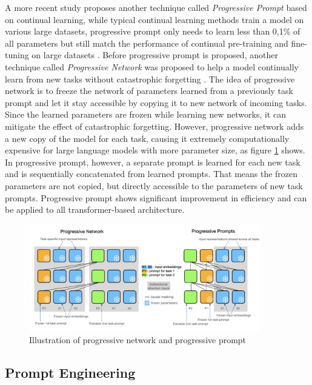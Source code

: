 \documentclass[runningheads]{llncs}
\begin{document}
\noindent \newline
A more recent study proposes another technique called \textit{Progressive Prompt} based on continual learning, while typical continual learning methods train a model on various large datasets, progressive prompt only needs
to learn less than 0,1\% of all parameters but still match the performance of continual pre-training and fine-tuning on large datasets \cite{Razda23}. Before progressive prompt is proposed, another technique called \textit{Progressive Network}
was proposed to help a model continually learn from new tasks without catastrophic forgetting \cite{Rusu16}. The idea of progressive network is to freeze the network of parameters learned from a previously task prompt and let it stay accessible by copying it to new
network of incoming tasks. Since the learned parameters are frozen while learning new networks, it can mitigate the effect of catastrophic forgetting. However, progressive network adds a new copy of the model for each task, causing it extremely 
computationally expensive for large language models with more parameter size, as figure \ref{fig:progressive} shows. In progressive prompt, however, a separate prompt is learned for each new task and is sequentially concatenated from learned prompts.
That means the frozen parameters are not copied, but directly accessible to the parameters of new task prompts. Progressive prompt shows significant improvement in efficiency and can be applied to all transformer-based architecture.
\begin{figure}[htbp]
  \centering
  \includegraphics[width=0.9\textwidth]{progressive.png}
  \caption{Illustration of progressive network and progressive prompt \cite{Razda23}}
  \label{fig:progressive}
\end{figure}

\subsection{Prompt Engineering}
\end{document}
